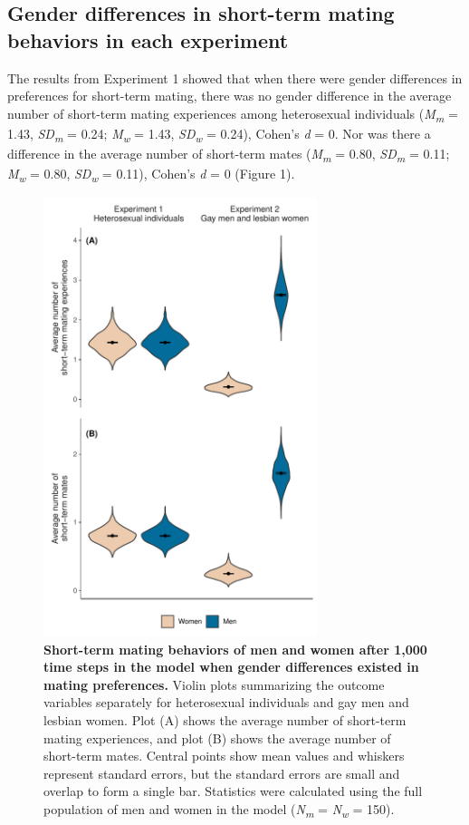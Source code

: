 \documentclass[
  11pt,
]{article}
\begin{document}
\hypertarget{gender-differences-in-short-term-mating-behaviors-in-each-experiment}{%
\subsection{Gender differences in short-term mating behaviors in each
experiment}\label{gender-differences-in-short-term-mating-behaviors-in-each-experiment}}

The results from Experiment 1 showed that when there were gender
differences in preferences for short-term mating, there was no gender
difference in the average number of short-term mating experiences among
heterosexual individuals (\emph{M\textsubscript{m}} = 1.43,
\emph{SD\textsubscript{m}} = 0.24; \emph{M\textsubscript{w}} = 1.43,
\emph{SD\textsubscript{w}} = 0.24), Cohen's \emph{d} = 0. Nor was there
a difference in the average number of short-term mates
(\emph{M\textsubscript{m}} = 0.80, \emph{SD\textsubscript{m}} = 0.11;
\emph{M\textsubscript{w}} = 0.80, \emph{SD\textsubscript{w}} = 0.11),
Cohen's \emph{d} = 0 (Figure 1).

\begin{figure}[h]
  \centering
  \includegraphics[width=80mm]{figures/fig1_men_vs_women.pdf}
  \caption{\textbf{Short-term mating behaviors of men and women after 1,000 time steps in the model when gender differences existed in mating preferences.} Violin plots summarizing the outcome variables separately for heterosexual individuals and gay men and lesbian women. Plot (A) shows the average number of short-term mating experiences, and plot (B) shows the average number of short-term mates. Central points show mean values and whiskers represent standard errors, but the standard errors are small and overlap to form a single bar. Statistics were calculated using the full population of men and women in the model (\textit{N\textsubscript{m}} = \textit{N\textsubscript{w}} = 150).}
\end{figure}
\end{document}
